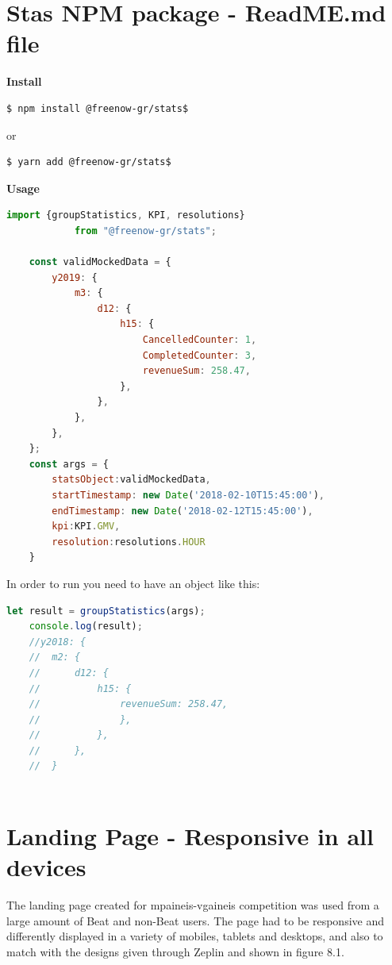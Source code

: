 \section{Stas NPM package - ReadME.md file}
	\textbf{Install}
	
	\begin{lstlisting}[language=bash]
	$ npm install @freenow-gr/stats$
	\end{lstlisting}
	
	or
	
	\begin{lstlisting}[language=bash]
	$ yarn add @freenow-gr/stats$
	\end{lstlisting}

	\textbf{Usage}
	
	\begin{lstlisting}[language=JavaScript]
	import {groupStatistics, KPI, resolutions} 
			from "@freenow-gr/stats";
	
	const validMockedData = {
		y2019: {
			m3: {
				d12: {
					h15: {
						CancelledCounter: 1,
						CompletedCounter: 3,
						revenueSum: 258.47,
					},
				},
			},
		},
	};	
	const args = {
		statsObject:validMockedData, 
		startTimestamp: new Date('2018-02-10T15:45:00'), 
		endTimestamp: new Date('2018-02-12T15:45:00'), 
		kpi:KPI.GMV, 
		resolution:resolutions.HOUR
	}
	\end{lstlisting}
	
	\newpage
	In order to run you need to have an object like this:
	
	\begin{lstlisting}[language=JavaScript]
	let result = groupStatistics(args);
	console.log(result);
	//y2018: {
	//	m2: {
	//		d12: {
	//			h15: {
	//				revenueSum: 258.47,
	//				},
	//			},
	//		},
	//	}
	
	\end{lstlisting}
	
	
\section{Landing Page - Responsive in all devices}

The landing page created for mpaineis-vgaineis competition was used from a large amount of Beat and non-Beat users. The page had to be responsive and differently displayed in a variety of mobiles, tablets and desktops, and also to match with the designs given through Zeplin and shown in figure 8.1.

